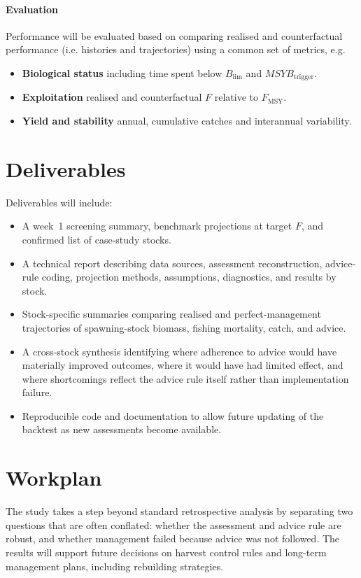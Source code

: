 \documentclass[11pt,a4paper]{extarticle}
\begin{document}
	\paragraph{Evaluation}
	Performance will be evaluated based on comparing realised and counterfactual performance (i.e. histories and trajectories) using a common set of metrics, e.g.
	
	\begin{itemize}
		\item \textbf{Biological status} including time spent below \(B_{\lim}\) and \(MSYB_{\mathrm{trigger}}\).
		\item \textbf{Exploitation} realised and counterfactual \(F\) relative to \(F_{\mathrm{MSY}}\).
		\item \textbf{Yield and stability} annual, cumulative catches and interannual variability.
	\end{itemize}
	
	\section*{Deliverables}	
	Deliverables will include:
	
	\begin{itemize}
		\item A week~1 screening summary, benchmark projections at target $F$, and confirmed list of case-study stocks.
		\item A technical report describing data sources, assessment reconstruction, advice-rule coding, projection methods, assumptions, diagnostics, and results by stock.
		\item Stock-specific summaries comparing realised and perfect-management trajectories of spawning-stock biomass, fishing mortality, catch, and advice.
		\item A cross-stock synthesis identifying where adherence to advice would have materially improved outcomes, where it would have had limited effect, and where shortcomings reflect the advice rule itself rather than implementation failure.
		\item Reproducible code and documentation to allow future updating of the backtest as new assessments become available.
	\end{itemize}
	
	\section*{Workplan}
	The study takes a step beyond standard retrospective analysis by separating two questions that are often conflated: whether the assessment and advice rule are robust, and whether management failed because advice was not followed. The results will support future decisions on harvest control rules and long-term management plans, including rebuilding strategies.
	
\end{document}
